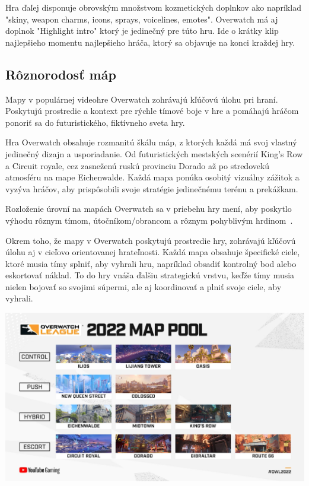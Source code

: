 \documentclass[10pt,oneside,slovak,a4paper]{article}
\begin{document}
Hra ďaľej disponuje obrovským množstvom kozmetických doplnkov ako napríklad "skiny, weapon charms, icons, sprays, voicelines, emotes". Overwatch
má aj doplnok "Highlight intro" ktorý je jedinečný pre túto hru. Ide o krátky klip najlepšieho momentu najlepšieho hráča, ktorý sa objavuje na konci kraždej hry.




\subsection{Rôznorodosť máp} \label{Rôznorodosť máp}

Mapy v populárnej videohre Overwatch zohrávajú kľúčovú úlohu pri hraní. Poskytujú prostredie a kontext pre rýchle tímové boje v hre a pomáhajú hráčom ponoriť sa do futuristického, fiktívneho sveta hry.

Hra Overwatch obsahuje rozmanitú škálu máp, z ktorých každá má svoj vlastný jedinečný dizajn a usporiadanie. Od futuristických mestských scenérií King's Row a Circuit royale, cez zasneženú ruskú provinciu Dorado až po stredovekú atmosféru na mape Eichenwalde. Každá mapa ponúka osobitý vizuálny zážitok a vyzýva hráčov, aby prispôsobili svoje stratégie jedinečnému terénu a prekážkam.

Rozloženie úrovní na mapách Overwatch sa v priebehu hry mení, aby poskytlo výhodu rôznym tímom, útočníkom/obrancom a rôznym pohyblivým hrdinom~\cite{Overwatchmaps}.

Okrem toho, že mapy v Overwatch poskytujú prostredie hry, zohrávajú kľúčovú úlohu aj v cieľovo orientovanej hrateľnosti. Každá mapa obsahuje špecifické ciele, ktoré musia tímy splniť, aby vyhrali hru, napríklad obsadiť kontrolný bod alebo eskortovať náklad. To do hry vnáša ďalšiu strategickú vrstvu, keďže tímy musia nielen bojovať so svojimi súpermi, ale aj koordinovať a plniť svoje ciele, aby vyhrali.

\includegraphics[scale=0.165]{images/overwatch_maps.png}
\end{document}
